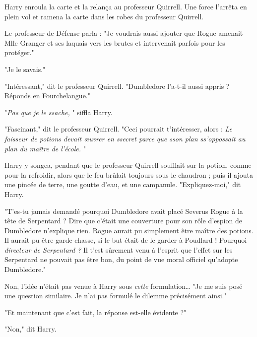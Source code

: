 Harry enroula la carte et la relança au professeur Quirrell. Une force l'arrêta en plein vol et ramena la carte dans les robes du professeur Quirrell.

Le professeur de Défense parla : "Je voudrais aussi ajouter que Rogue amenait Mlle Granger et ses laquais vers les brutes et intervenait parfois pour les protéger."

"Je le savais."

"Intéressant," dit le professeur Quirrell. "Dumbledore l'a-t-il aussi appris ? Réponds en Fourchelangue."

"\emph{Pas que je le ssache,} " siffla Harry.

"Fascinant," dit le professeur Quirrell. "Ceci pourrait t'intéresser, alors : \emph{Le faisseur de potions devait œuvrer en ssecret parce que sson plan ss'oppossait au plan du maître de l'école.} "

Harry y songea, pendant que le professeur Quirrell soufflait sur la potion, comme pour la refroidir, alors que le feu brûlait toujours sous le chaudron ; puis il ajouta une pincée de terre, une goutte d'eau, et une campanule. "Expliquez-moi," dit Harry.

"T'es-tu jamais demandé pourquoi Dumbledore avait placé Severus Rogue à la tête de Serpentard ? Dire que c'était une couverture pour son rôle d'espion de Dumbledore n'explique rien. Rogue aurait pu simplement être maître des potions. Il aurait pu être garde-chasse, si le but était de le garder à Poudlard ! Pourquoi \emph{directeur de Serpentard ?}  Il t'est sûrement venu à l'esprit que l'effet sur les Serpentard ne pouvait pas être bon, du point de vue moral officiel qu'adopte Dumbledore."

Non, l'idée n'était pas venue à Harry sous \emph{cette}  formulation… "Je me suis posé une question similaire. Je n'ai pas formulé le dilemme précisément ainsi."

"Et maintenant que c'est fait, la réponse est-elle évidente ?"

"Non," dit Harry.

